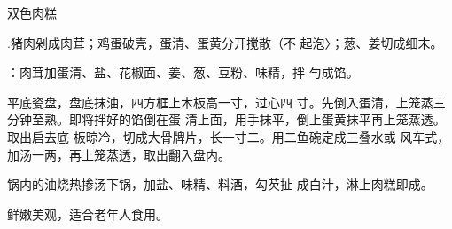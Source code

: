 \begin{recipe}[金银肉糕]{双色肉糕}

\ingredients


\cooking

\step .猪肉剁成肉茸；鸡蛋破壳，蛋清、蛋黄分开搅散（不 起泡〉；葱、姜切成细末。

\step ：肉茸加蛋清、盐、花椒面、姜、葱、豆粉、味精，拌 勻成馅。

\step 平底瓷盘，盘底抹油，四方框上木板高一寸，过心四 寸。先倒入蛋清，上笼蒸三分钟至熟。即将拌好的馅倒在蛋 清上面，用手抹平，倒上蛋黄抹平再上笼蒸透。取出启去底 板晾冷，切成大骨牌片，长一寸二。用二鱼碗定成三叠水或 风车式，加汤一两，再上笼蒸透，取出翻入盘内。

\step 锅内的油烧热掺汤下锅，加盐、味精、料酒，勾芡扯 成白汁，淋上肉糕即成。

\notes

鲜嫩美观，适合老年人食用。



\end{recipe}

